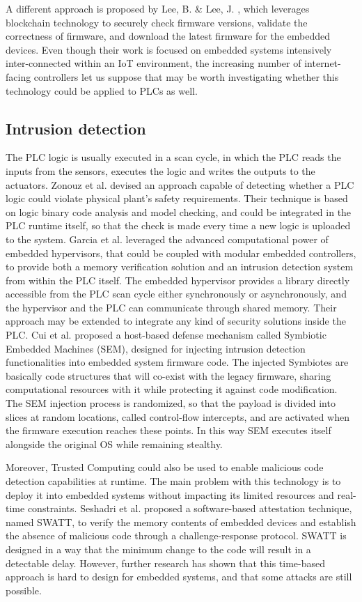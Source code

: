 A different approach is proposed by Lee, B. \& Lee, J. \cite{blockchain}, which leverages blockchain technology to securely check firmware versions,
validate the correctness of firmware, and download the latest firmware for the embedded devices.
Even though their work is focused on embedded systems intensively inter-connected within an IoT environment, the increasing number of internet-facing controllers
let us suppose that may be worth investigating whether this technology could be applied to PLCs as well. 


\subsection{Intrusion detection}

The PLC logic is usually executed in a scan cycle, in which the PLC reads the inputs from the sensors, executes the logic and writes the outputs to the actuators.
Zonouz et al. \cite{logic-analytics} devised an approach capable of detecting whether a PLC logic could violate physical plant's safety requirements.
Their technique is based on logic binary code analysis and model checking, and could be integrated in the PLC runtime itself, so that the check is made every time a new logic is
uploaded to the system.
Garcia et al. \cite{hypervisor-control} leveraged the advanced computational power of embedded hypervisors, that could be coupled with modular embedded controllers,
to provide both a memory verification solution and an intrusion detection system from within the PLC itself.
The embedded hypervisor provides a library directly accessible from the PLC scan cycle either synchronously or asynchronously,
and the hypervisor and the PLC can communicate through shared memory. Their approach may be extended to integrate any kind of security solutions inside the PLC.
Cui et al. \cite{symbiotes} proposed a host-based defense mechanism called Symbiotic Embedded Machines (SEM), designed for injecting
intrusion detection functionalities into embedded system firmware code. The injected Symbiotes are basically code structures that will co-exist
with the legacy firmware, sharing computational resources with it while protecting it against code modification.
The SEM injection process is randomized, so that the payload is divided into slices at random locations, called control-flow intercepts,
and are activated when the firmware execution reaches these points. In this way SEM executes itself alongside the original OS while remaining stealthy.

Moreover, Trusted Computing could also be used to enable malicious code detection capabilities at runtime. The main problem with this technology is to deploy it into
embedded systems without impacting its limited resources and real-time constraints. Seshadri et al. \cite{swatt} proposed a software-based attestation technique,
named SWATT, to verify the memory contents of embedded devices and establish the absence of malicious code through a challenge-response protocol.
SWATT is designed in a way that the minimum change to the code will result in a detectable delay. However, further research \cite{swatt-difficulty} has shown that
this time-based approach is hard to design for embedded systems, and that some attacks are still possible.

